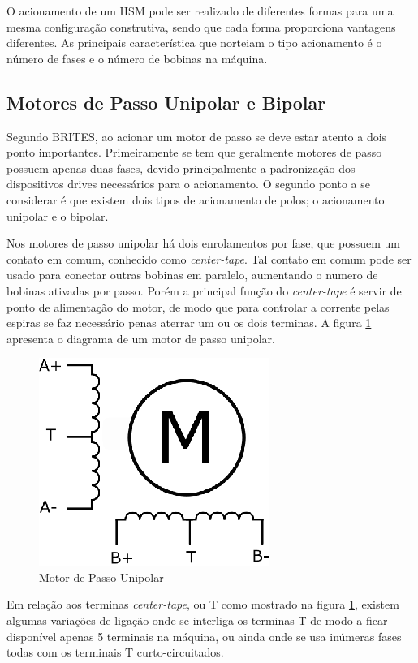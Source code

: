 O acionamento de um HSM pode ser realizado de diferentes formas para uma mesma configuração construtiva, sendo que cada forma proporciona vantagens diferentes. As principais característica que norteiam o tipo acionamento  é o número de  fases e o número de bobinas na máquina.

\subsection{Motores de Passo Unipolar e Bipolar}

Segundo BRITES\cite{PETele}, ao acionar um motor de passo se deve estar atento a dois ponto importantes. Primeiramente se tem que geralmente motores de passo possuem apenas duas fases, devido principalmente a padronização dos dispositivos drives necessários para o acionamento. O segundo ponto a se considerar é que existem dois tipos de acionamento de polos; o acionamento unipolar e o bipolar.  

Nos motores de passo unipolar há dois enrolamentos por fase, que possuem um contato em comum, conhecido como \emph{center-tape}. Tal contato em comum pode ser usado para conectar outras bobinas em paralelo, aumentando o numero de bobinas ativadas por passo. Porém a principal função do \emph{center-tape} é servir de ponto de alimentação do motor, de modo que para controlar a corrente pelas espiras se faz necessário penas aterrar um ou os dois terminas. A figura \ref{fig:MotorDePassoUnipolar} apresenta o diagrama de um motor de passo unipolar. 

\begin{figure}[H]
	\centering
	\includegraphics[width = 0.3 \columnwidth]{images/MotorDePassoUnipolar.eps}
	\caption{Motor de Passo Unipolar}
	\label{fig:MotorDePassoUnipolar}
\end{figure} 

Em relação aos terminas \emph{center-tape}, ou T como mostrado na figura \ref{fig:MotorDePassoUnipolar}, existem algumas variações de ligação onde se interliga os terminas T de modo a ficar disponível apenas 5 terminais na máquina, ou ainda onde se usa inúmeras fases todas com os terminais T curto-circuitados.   

